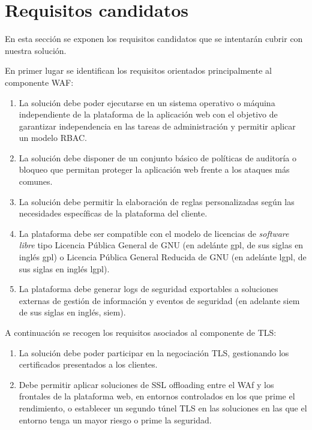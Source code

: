 \chapter{Requisitos candidatos}
\par En esta sección se exponen los requisitos candidatos que se intentarán cubrir con nuestra solución.
\par En primer lugar se identifican los requisitos orientados principalmente al componente WAF:
\begin{enumerate}[\bfseries{}R1. ]
  \item La solución debe poder ejecutarse en un sistema operativo o máquina independiente de la plataforma de la aplicación web con el
    objetivo de garantizar independencia en las tareas de administración y permitir aplicar un modelo RBAC.
  \item La solución debe disponer de un conjunto básico de políticas de auditoría o bloqueo que permitan proteger la aplicación web frente a
    los ataques más comunes.
  \item La solución debe permitir la elaboración de reglas personalizadas según las necesidades específicas de la plataforma del cliente.
  \item La plataforma debe ser compatible con el modelo de licencias de {\em software libre\cite{softwarelibre}} tipo
    Licencia Pública General de GNU (en adelánte \acrshort{gpl}, de  sus siglas en inglés \acrlong{gpl}) o Licencia Pública General Reducida
    de GNU (en adelánte \acrshort{lgpl}, de  sus siglas en inglés \acrlong{lgpl}).
  \item La plataforma debe generar logs de seguridad exportables a soluciones externas de gestión de información y eventos de seguridad (en
    adelante \acrshort{siem} de sus siglas en inglés, \acrlong{siem}).
\end{enumerate}

\par A continuación se recogen los requisitos asociados al componente de TLS:
\begin{enumerate}[\bfseries{}R1. ]
  \item La solución debe poder participar en la negociación TLS, gestionando los certificados presentados a los clientes.
  \item Debe permitir aplicar soluciones de SSL offloading entre el WAf y los frontales de la plataforma web, en entornos controlados en los
    que prime el rendimiento, o establecer un segundo túnel TLS en las soluciones en las que el entorno tenga un mayor riesgo o prime la
    seguridad.
\end{enumerate}

